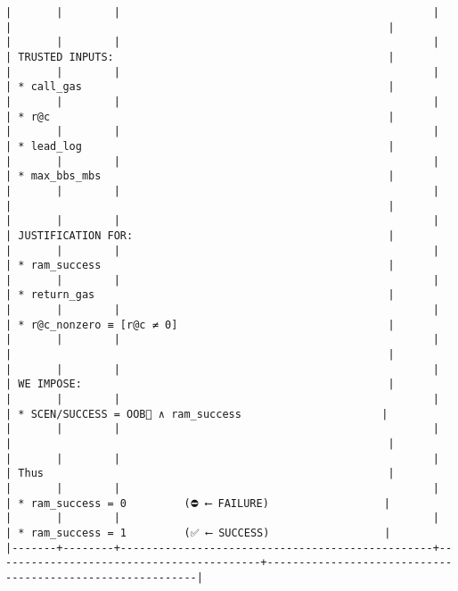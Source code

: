 \documentclass[varwidth=\maxdimen,margin=0.5cm,multi={verbatim}]{standalone}
\begin{document}
\begin{verbatim}
|       |        |                                                 |                                          |                                                           |
|       |        |                                                 |                                          | TRUSTED INPUTS:                                           |
|       |        |                                                 |                                          | * call_gas                                                |
|       |        |                                                 |                                          | * r@c                                                     |
|       |        |                                                 |                                          | * lead_log                                                |
|       |        |                                                 |                                          | * max_bbs_mbs                                             |
|       |        |                                                 |                                          |                                                           |
|       |        |                                                 |                                          | JUSTIFICATION FOR:                                        |
|       |        |                                                 |                                          | * ram_success                                             |
|       |        |                                                 |                                          | * return_gas                                              |
|       |        |                                                 |                                          | * r@c_nonzero ≡ [r@c ≠ 0]                                 |
|       |        |                                                 |                                          |                                                           |
|       |        |                                                 |                                          | WE IMPOSE:                                                |
|       |        |                                                 |                                          | * SCEN/SUCCESS = OOB🏴 ∧ ram_success                      |
|       |        |                                                 |                                          |                                                           |
|       |        |                                                 |                                          | Thus                                                      |
|       |        |                                                 |                                          | * ram_success = 0         (⛔ ⟵ FAILURE)                  |
|       |        |                                                 |                                          | * ram_success = 1         (✅ ⟵ SUCCESS)                  |
|-------+--------+-------------------------------------------------+------------------------------------------+-----------------------------------------------------------|
\end{verbatim}
\end{document}
